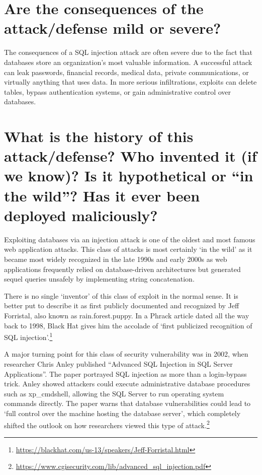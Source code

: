 \documentclass[12pt]{article}
\begin{document}
\section{Are the consequences of the attack/defense mild or severe?}

The consequences of a SQL injection attack are often severe due to the fact that databases store an organization’s most valuable information. A successful attack can leak passwords, financial records, medical data, private communications, or virtually anything that uses data. In more serious infiltrations, exploits can delete tables, bypass authentication systems, or gain administrative control over databases.

\section{What is the history of this attack/defense? Who invented it (if we know)? Is it hypothetical or “in the wild”? Has it ever been deployed maliciously?}

Exploiting databases via an injection attack is one of the oldest and most famous web application attacks. This class of attacks is most certainly ‘in the wild’ as it became most widely recognized in the late 1990s and early 2000s as web applications frequently relied on database-driven architectures but generated sequel queries unsafely by implementing string concatenation.

There is no single ‘inventor’ of this class of exploit in the normal sense. It is better put to describe it as first publicly documented and recognized by Jeff Forristal, also known as rain.forest.puppy. In a Phrack article dated all the way back to 1998, Black Hat gives him the accolade of ‘first publicized recognition of SQL injection’.\footnote{\url{https://blackhat.com/us-13/speakers/Jeff-Forristal.html}}

A major turning point for this class of security vulnerability was in 2002, when researcher Chris Anley published “Advanced SQL Injection in SQL Server Applications”. The paper portrayed SQL injection as more than a login-bypass trick. Anley showed attackers could execute administrative database procedures such as xp\_cmdshell, allowing the SQL Server to run operating system commands directly. The paper warns that database vulnerabilities could lead to ‘full control over the machine hosting the database server’, which completely shifted the outlook on how researchers viewed this type of attack.\footnote{\url{https://www.cgisecurity.com/lib/advanced_sql_injection.pdf}}
\end{document}
